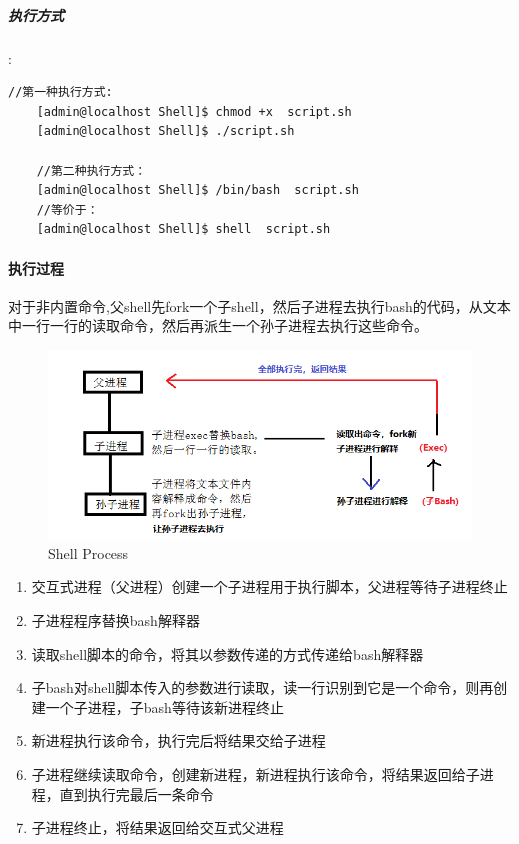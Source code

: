 \documentclass[UTF8,a4paper,12pt]{ctexbook}
\begin{document}
			 \subparagraph{执行方式}:
				 \begin{lstlisting}[frame=L,xleftmargin=.06\textwidth]
	//第一种执行方式:
	[admin@localhost Shell]$ chmod +x  script.sh
	[admin@localhost Shell]$ ./script.sh
	
	//第二种执行方式：
	[admin@localhost Shell]$ /bin/bash  script.sh
	//等价于：
	[admin@localhost Shell]$ shell  script.sh
				 \end{lstlisting}
		 
			 \paragraph{执行过程}
			 	对于非内置命令,父shell先fork一个子shell，然后子进程去执行bash的代码，从文本中一行一行的读取命令，然后再派生一个孙子进程去执行这些命令。
			 	
			 	\begin{figure}[H]
			 		\centering
			 		\includegraphics[scale=0.7]{shellProcess}
			 		\caption{Shell Process}
			 	\end{figure}
				 
				 \begin{enumerate}
				 	\item 交互式进程（父进程）创建一个子进程用于执行脚本，父进程等待子进程终止
				 	\item 子进程程序替换bash解释器
				 	\item 读取shell脚本的命令，将其以参数传递的方式传递给bash解释器
				 	\item 子bash对shell脚本传入的参数进行读取，读一行识别到它是一个命令，则再创建一个子进程，子bash等待该新进程终止
				 	\item 新进程执行该命令，执行完后将结果交给子进程
				 	\item 子进程继续读取命令，创建新进程，新进程执行该命令，将结果返回给子进程，直到执行完最后一条命令
				 	\item 子进程终止，将结果返回给交互式父进程
				 \end{enumerate}
				 
\end{document}
